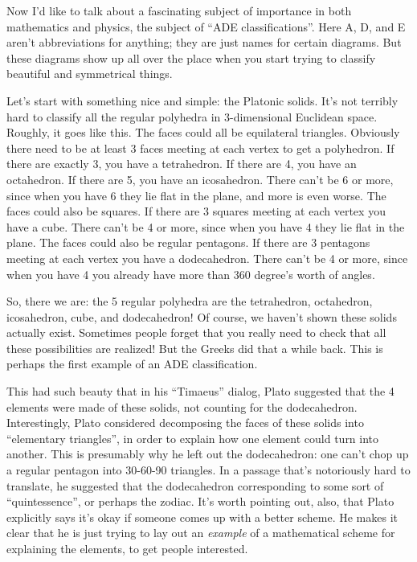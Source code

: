 \documentclass{article}
\begin{document}
Now I'd like to talk about a fascinating subject of importance in both
mathematics and physics, the subject of ``ADE classifications''. Here A,
D, and E aren't abbreviations for anything; they are just names for
certain diagrams. But these diagrams show up all over the place when you
start trying to classify beautiful and symmetrical things.

Let's start with something nice and simple: the Platonic solids. It's
not terribly hard to classify all the regular polyhedra in
\(3\)-dimensional Euclidean space. Roughly, it goes like this. The faces
could all be equilateral triangles. Obviously there need to be at least
3 faces meeting at each vertex to get a polyhedron. If there are exactly
3, you have a tetrahedron. If there are 4, you have an octahedron. If
there are 5, you have an icosahedron. There can't be 6 or more, since
when you have 6 they lie flat in the plane, and more is even worse. The
faces could also be squares. If there are 3 squares meeting at each
vertex you have a cube. There can't be 4 or more, since when you have 4
they lie flat in the plane. The faces could also be regular pentagons.
If there are 3 pentagons meeting at each vertex you have a dodecahedron.
There can't be 4 or more, since when you have 4 you already have more
than 360 degree's worth of angles.

So, there we are: the 5 regular polyhedra are the tetrahedron,
octahedron, icosahedron, cube, and dodecahedron! Of course, we haven't
shown these solids actually exist. Sometimes people forget that you
really need to check that all these possibilities are realized! But the
Greeks did that a while back. This is perhaps the first example of an
ADE classification.

This had such beauty that in his ``Timaeus'' dialog, Plato suggested
that the 4 elements were made of these solids, not counting for the
dodecahedron. Interestingly, Plato considered decomposing the faces of
these solids into ``elementary triangles'', in order to explain how one
element could turn into another. This is presumably why he left out the
dodecahedron: one can't chop up a regular pentagon into 30-60-90
triangles. In a passage that's notoriously hard to translate, he
suggested that the dodecahedron corresponding to some sort of
``quintessence'', or perhaps the zodiac. It's worth pointing out, also,
that Plato explicitly says it's okay if someone comes up with a better
scheme. He makes it clear that he is just trying to lay out an
\emph{example} of a mathematical scheme for explaining the elements, to
get people interested.
\end{document}
